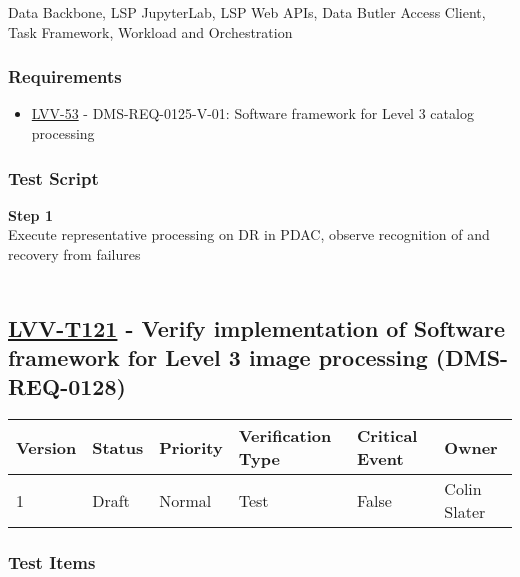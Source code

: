 Data Backbone, LSP JupyterLab, LSP Web APIs, Data Butler Access Client,
Task Framework, Workload and Orchestration

\hypertarget{requirements-97}{%
\subsubsection{Requirements}\label{requirements-97}}

\begin{itemize}
\tightlist
\item
  \href{https://jira.lsstcorp.org/browse/LVV-53}{LVV-53} -
  DMS-REQ-0125-V-01: Software framework for Level 3 catalog processing
\end{itemize}

\hypertarget{test-script-97}{%
\subsubsection{Test Script}\label{test-script-97}}

\textbf{Step 1}\\
Execute representative processing on DR in PDAC, observe recognition of
and recovery from failures\\
~\\

\hypertarget{lvv-t121---verify-implementation-of-software-framework-for-level-3-image-processing-dms-req-0128}{%
\subsection{\texorpdfstring{\href{https://jira.lsstcorp.org/secure/Tests.jspa\#/testCase/LVV-T121}{LVV-T121}
- Verify implementation of Software framework for Level 3 image
processing
(DMS-REQ-0128)}{LVV-T121 - Verify implementation of Software framework for Level 3 image processing (DMS-REQ-0128)}}\label{lvv-t121---verify-implementation-of-software-framework-for-level-3-image-processing-dms-req-0128}}

\begin{longtable}[]{@{}llllll@{}}
\toprule
Version & Status & Priority & Verification Type & Critical Event &
Owner\tabularnewline
\midrule
\endhead
1 & Draft & Normal & Test & False & Colin Slater\tabularnewline
\bottomrule
\end{longtable}

\hypertarget{test-items-97}{%
\subsubsection{Test Items}\label{test-items-97}}

